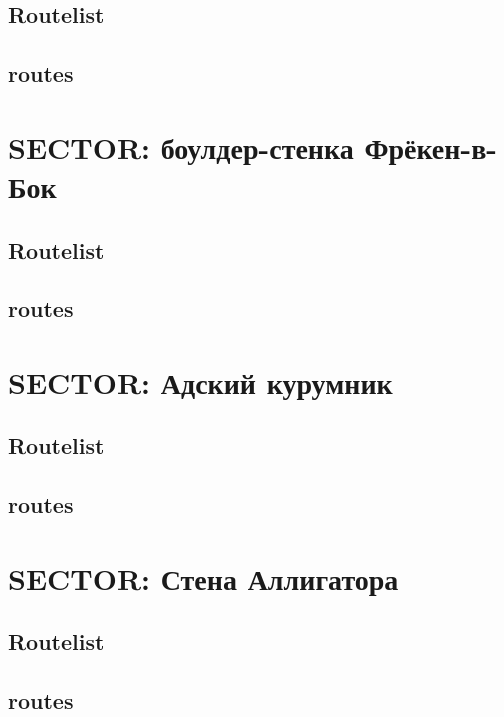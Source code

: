 \documentclass[8pt, a4paper,notitlepage,openany]{report}
\begin{document}
\section*{Routelist}

\newpage
\section*{routes}



\chapter{SECTOR: боулдер-стенка Фрёкен-в-Бок}
\section*{Routelist}

\newpage
\section*{routes}





\chapter{SECTOR: Адский курумник}
\section*{Routelist}

\newpage
\section*{routes}




\chapter{SECTOR: Стена Аллигатора}
\section*{Routelist}

\newpage
\section*{routes}

\end{document}
